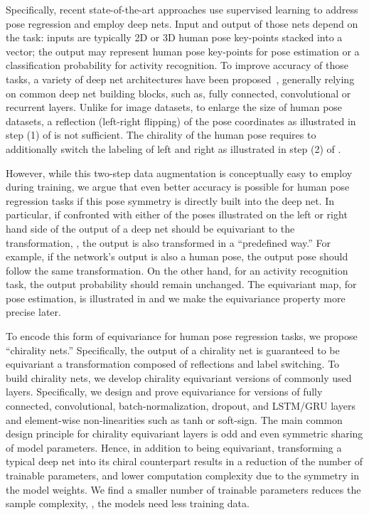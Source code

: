 \documentclass{article}
\begin{document}
Specifically, recent state-of-the-art approaches use supervised learning to address pose regression and employ deep nets. Input and output  of those nets depend on the task: inputs are typically 2D or 3D human pose key-points stacked into a vector; the output may represent human pose key-points for pose estimation or a classification probability for activity recognition. To improve accuracy of those tasks, a variety of deep net architectures have been proposed~\cite{martinez2017human, chao2017forecasting, hossain2018exploiting, lee2018propagating, pavllo20193d, si2018skeleton}, generally relying on common deep net building blocks, such as, fully connected, convolutional or recurrent layers. Unlike for image datasets, to enlarge the size of human pose datasets, a  reflection (left-right flipping) of the pose coordinates as illustrated in step (1) of  is not sufficient. The chirality of the human pose requires to additionally switch the labeling of left and right as illustrated in step (2) of .

However, while this two-step data augmentation is conceptually easy to employ during training, we argue that even better accuracy is possible for human pose regression tasks if this pose symmetry is directly built into the deep net. In particular, if confronted with either of the poses illustrated on the left or right hand side of  the  output of a  deep net should be equivariant to the transformation, \ie, the output is also transformed in a ``predefined way.''  For example, if the network's output is also a human pose, the output pose should follow the same transformation. On the other hand, for an activity recognition task, the output probability should remain unchanged. The equivariant map, for pose estimation, is illustrated in  and we make the equivariance property more precise  later. 

To encode this form of equivariance for human pose regression tasks, we propose ``chirality nets.'' Specifically, the output of a chirality net is guaranteed to be equivariant \wrt a transformation composed of reflections and label switching. To build chirality nets, we develop 
chirality equivariant versions of  commonly used layers. Specifically, we design and prove equivariance for versions of fully connected, convolutional, batch-normalization, dropout, and LSTM/GRU layers and element-wise non-linearities such as tanh or soft-sign.
 The main common design principle for chirality equivariant layers is  odd and even symmetric sharing of model parameters. Hence, in addition to being equivariant, transforming a typical deep net into its chiral counterpart results in a reduction of the number of trainable parameters, and lower computation complexity due to the symmetry in the model weights.  We find a smaller number of trainable parameters reduces the sample complexity, \ie, the models need less training data.
\end{document}
